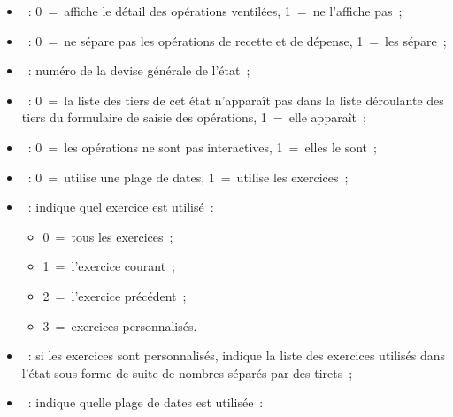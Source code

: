 \begin{itemize}
\item  {}~: 0~=~affiche le détail des opérations ventilées, 1~=~ne l'affiche pas~;

\item  {}~: 0~=~ne sépare pas les opérations de recette et de dépense, 1~=~les sépare~;

\item  {}~: numéro de la devise générale de l'état~;

\item  {}~: 0~=~la liste des tiers de cet état n'apparaît pas dans la liste déroulante des tiers du formulaire de saisie des opérations, 1~=~elle apparaît~;

\item  {}~: 0~=~les opérations ne sont pas interactives, 1~=~elles le sont~;

\item  {}~: 0~=~utilise une plage de dates, 1~=~utilise les exercices~;

\item  {}~: indique quel exercice est utilisé~:

	\begin{itemize}

	\item 0~=~tous les exercices~;

	\item 1~=~l'exercice courant~;

	\item 2~=~l'exercice précédent~;

	\item 3~=~exercices personnalisés.

	\end{itemize} 

\item  {}~: si les exercices sont personnalisés, indique la liste des exercices utilisés dans l'état sous forme de suite de nombres séparés par des tirets~;

\item  {}~: indique quelle plage de dates est utilisée~:


\end{itemize}
